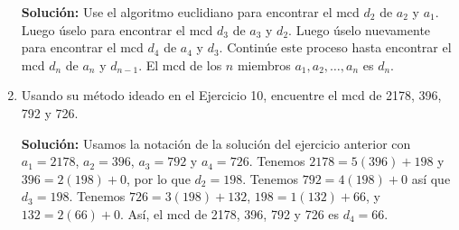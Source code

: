 \begin{enumerate}
    \textbf{Solución:} Use el algoritmo euclidiano para encontrar el mcd \( d_2 \) de \( a_2 \) y \( a_1 \). Luego úselo para encontrar el mcd \( d_3 \) de \( a_3 \) y \( d_2 \). Luego úselo nuevamente para encontrar el mcd \( d_4 \) de \( a_4 \) y \( d_3 \). Continúe este proceso hasta encontrar el mcd \( d_n \) de \( a_n \) y \( d_{n-1} \). El mcd de los \( n \) miembros \( a_1, a_2, \ldots, a_n \) es \( d_n \).
    
    \item Usando su método ideado en el Ejercicio 10, encuentre el mcd de 2178, 396, 792 y 726.
    
    \textbf{Solución:} Usamos la notación de la solución del ejercicio anterior con \( a_1 = 2178 \), \( a_2 = 396 \), \( a_3 = 792 \) y \( a_4 = 726 \). Tenemos \( 2178 = 5(396) + 198 \) y \( 396 = 2(198) + 0 \), por lo que \( d_2 = 198 \). Tenemos \( 792 = 4(198) + 0 \) así que \( d_3 = 198 \). Tenemos \( 726 = 3(198) + 132 \), \( 198 = 1(132) + 66 \), y \( 132 = 2(66) + 0 \). Así, el mcd de 2178, 396, 792 y 726 es \( d_4 = 66 \).
\end{enumerate}
